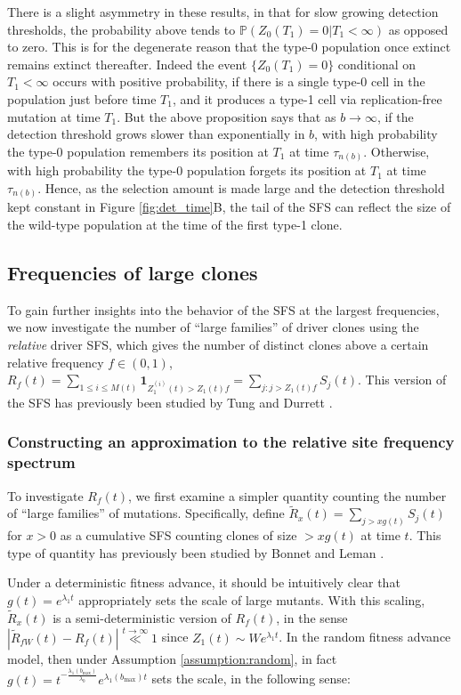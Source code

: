 \documentclass{article}
\numberwithin{equation}{section}
\newcommand{\llas}[2]{\overset{{#1}\to {#2}}{\ll}}
\begin{document}
There is a slight asymmetry in these results, in that for slow growing detection thresholds, the probability above tends to $\mathbb{P}(Z_0(T_1)=0|T_1<\infty)$ as opposed to zero. This is for the degenerate reason that the type-0 population once extinct remains extinct thereafter. Indeed the event $\{Z_0(T_1)=0\}$ conditional on $T_1<\infty$ occurs with positive probability, if there is a single type-0 cell in the population just before time $T_1$, and it produces a type-1 cell via replication-free mutation at time $T_1$. But the above proposition says that as $b\to\infty$, if the detection threshold grows slower than exponentially in $b$, with high probability the type-0 population remembers its position at $T_1$ at time $\tau_{n(b)}$. Otherwise, with high probability the type-0 population forgets its position at $T_1$ at time $\tau_{n(b)}$. Hence, as the selection amount is made large and the detection threshold kept constant in Figure \ref{fig:det_time}B, the tail of the SFS can reflect the size of the wild-type population at the time of the first type-1 clone.


\subsection{Frequencies of large clones}\label{sec:large_frequencies}
To gain further insights into the behavior of the SFS at the largest frequencies, we now investigate the number of ``large families'' of driver clones using the {\em relative} driver SFS, which gives the number of distinct clones above a certain relative frequency $f\in (0,1)$, $R_f(t)=\sum_{1\leq i\leq M(t)}\mathbf{1}_{Z_1^{(i)}(t)>Z_1(t)f}=\sum_{j:j>Z_1(t)f}S_j(t)$. This version of the SFS has previously been studied by Tung and Durrett \cite{tung}.

\subsubsection{Constructing an approximation to the relative site frequency spectrum}
To investigate $R_f(t)$, we first examine a simpler quantity counting the number of ``large families'' of mutations.  Specifically, define $\widetilde{R}_x(t)=\sum_{j> xg(t)}S_j(t)$ for $x>0$ as a cumulative SFS counting clones of size $> xg(t)$ at time $t$. This type of quantity has previously been studied by Bonnet and Leman \cite{bonnet2024}.

Under a deterministic fitness advance, it should be intuitively clear that $g(t)=e^{\lambda_1 t}$ appropriately sets the scale of large mutants. 
With this scaling, $\widetilde{R}_x(t)$ is a semi-deterministic version of $R_f(t)$, in the sense $|\widetilde{R}_{fW}(t)-R_f(t)|\llas{t}{\infty}1$ since $Z_1(t)\sim We^{\lambda_1 t}$.
In the random fitness advance model, then under Assumption \ref{assumption:random}, in fact $g(t)=t^{-\frac{\lambda_1(b_{\max})}{\lambda_0}}e^{\lambda_1(b_{\max})t}$ sets the scale, in the following sense:
\end{document}
